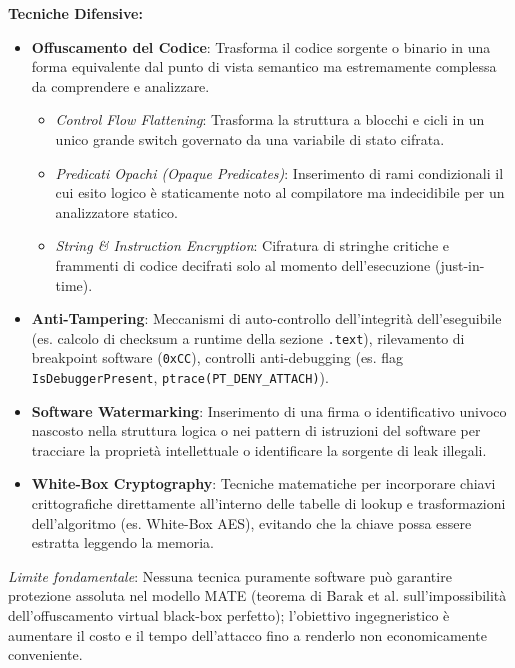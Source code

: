 \documentclass[11pt,a4paper]{article}
\begin{document}
\begin{solutionbox}
\textbf{Tecniche Difensive:}
\begin{itemize}
    \item \textbf{Offuscamento del Codice}: Trasforma il codice sorgente o binario in una forma equivalente dal punto di vista semantico ma estremamente complessa da comprendere e analizzare.
    \begin{itemize}
        \item \textit{Control Flow Flattening}: Trasforma la struttura a blocchi e cicli in un unico grande switch governato da una variabile di stato cifrata.
        \item \textit{Predicati Opachi (Opaque Predicates)}: Inserimento di rami condizionali il cui esito logico \`e staticamente noto al compilatore ma indecidibile per un analizzatore statico.
        \item \textit{String \& Instruction Encryption}: Cifratura di stringhe critiche e frammenti di codice decifrati solo al momento dell'esecuzione (just-in-time).
    \end{itemize}
    \item \textbf{Anti-Tampering}: Meccanismi di auto-controllo dell'integrit\`a dell'eseguibile (es. calcolo di checksum a runtime della sezione \texttt{.text}), rilevamento di breakpoint software (\texttt{0xCC}), controlli anti-debugging (es. flag \texttt{IsDebuggerPresent}, \texttt{ptrace(PT\_DENY\_ATTACH)}).
    \item \textbf{Software Watermarking}: Inserimento di una firma o identificativo univoco nascosto nella struttura logica o nei pattern di istruzioni del software per tracciare la propriet\`a intellettuale o identificare la sorgente di leak illegali.
    \item \textbf{White-Box Cryptography}: Tecniche matematiche per incorporare chiavi crittografiche direttamente all'interno delle tabelle di lookup e trasformazioni dell'algoritmo (es. White-Box AES), evitando che la chiave possa essere estratta leggendo la memoria.
\end{itemize}
\textit{Limite fondamentale}: Nessuna tecnica puramente software pu\`o garantire protezione assoluta nel modello MATE (teorema di Barak et al. sull'impossibilit\`a dell'offuscamento virtual black-box perfetto); l'obiettivo ingegneristico \`e aumentare il costo e il tempo dell'attacco fino a renderlo non economicamente conveniente.
\end{solutionbox}
\end{document}
